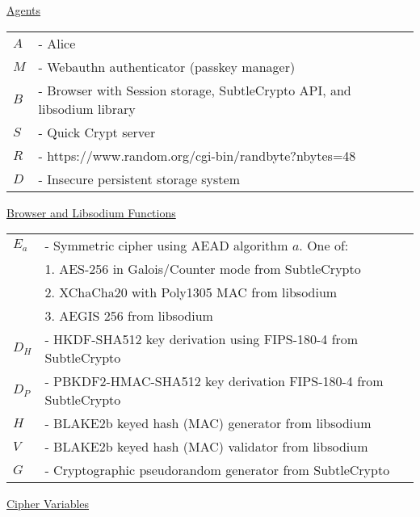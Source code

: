 \documentclass{article}
\begin{document}
\underline{Agents}\\

\begin{tabular}{@{}p{2mm} l}
$A$ & \textrm{ - Alice} \\
$M$ & \textrm{ - Webauthn authenticator (passkey manager)} \\
$B$ & \textrm{ - Browser with Session storage, SubtleCrypto API, and libsodium library} \\
$S$ & \textrm{ - Quick Crypt server} \\
$R$ & \textrm{ - https://www.random.org/cgi-bin/randbyte?nbytes=48} \\
$D$ & \textrm{ - Insecure persistent storage system} \\
\end{tabular}

\hfill \break


\underline{Browser and Libsodium Functions}\\

\begin{tabular}{@{}p{2mm} l}
$E_a$ & \textrm{ - Symmetric cipher using AEAD algorithm }$a$\textrm{. One of:}\\
& \hspace{23pt}\textrm{1. AES-256 in Galois/Counter mode from SubtleCrypto} \\
& \hspace{23pt}\textrm{2. XChaCha20 with Poly1305 MAC from libsodium} \\
& \hspace{23pt}\textrm{3. AEGIS 256 from libsodium} \\
$D_H$ & \textrm{ - HKDF-SHA512 key derivation using FIPS-180-4 from SubtleCrypto} \\
$D_P$ & \textrm{ - PBKDF2-HMAC-SHA512 key derivation FIPS-180-4 from SubtleCrypto} \\
$H$ & \textrm{ - BLAKE2b keyed hash (MAC) generator from libsodium} \\
$V$ & \textrm{ - BLAKE2b keyed hash (MAC) validator from libsodium} \\
$G$ & \textrm{ - Cryptographic pseudorandom generator from SubtleCrypto} \\
\end{tabular}

\hfill \break

\underline{Cipher Variables}\\
\end{document}

